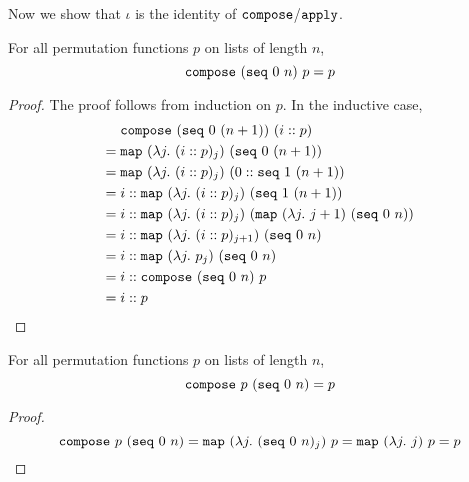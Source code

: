\documentclass[sigplan,10pt,anonymous,review]{thesis}
\begin{document}
Now we show that $\iota$ is the identity of $\texttt{\textup{compose}}$/$\texttt{\textup{apply}}$.
\begin{theorem}[compose\_id\_l]
  For all permutation functions $p$ on lists of length $n$,
  \begin{equation*}
    \texttt{\textup{compose}}~(\texttt{\textup{seq}}~0~n)~p = p
  \end{equation*}
\end{theorem}
\begin{proof}
  The proof follows from induction on $p$. In the inductive case,
  \begin{align*}
    {}& \texttt{\textup{compose}}~(\texttt{\textup{seq}}~0~(n+1))~(i::p) \\
    ={}& \texttt{\textup{map}}~(\lambda j.~(i::p)_j)~(\texttt{\textup{seq}}~0~(n+1)) \\
    ={}& \texttt{\textup{map}}~(\lambda j.~(i::p)_j)~(0 :: \texttt{\textup{seq}}~1~(n+1)) \\
    ={}& i :: \texttt{\textup{map}}~(\lambda j.~(i::p)_j)~(\texttt{\textup{seq}}~1~(n+1)) \\
    ={}& i :: \texttt{\textup{map}}~(\lambda j.~(i::p)_j)~(\texttt{\textup{map}}~(\lambda j.~j+1)~(\texttt{\textup{seq}}~0~n)) \\
    ={}& i :: \texttt{\textup{map}}~(\lambda j.~(i::p)_{j+1})~(\texttt{\textup{seq}}~0~n) \\
    ={}& i :: \texttt{\textup{map}}~(\lambda j.~p_j)~(\texttt{\textup{seq}}~0~n) \\
    ={}& i :: \texttt{\textup{compose}}~(\texttt{\textup{seq}}~0~n)~p \\
    ={}& i :: p \qedhere
  \end{align*}
\end{proof}

\begin{theorem}[compose\_id\_r]
  For all permutation functions $p$ on lists of length $n$,
  \begin{equation*}
    \texttt{\textup{compose}}~p~(\texttt{\textup{seq}}~0~n) = p
  \end{equation*}
\end{theorem}
\begin{proof}
  \begin{equation*}
    \texttt{\textup{compose}}~p~(\texttt{\textup{seq}}~0~n)
    = \texttt{\textup{map}}~(\lambda j.~(\texttt{\textup{seq}}~0~n)_j)~p
    = \texttt{\textup{map}}~(\lambda j.~j)~p
    = p \qedhere
  \end{equation*}
\end{proof}
\end{document}
